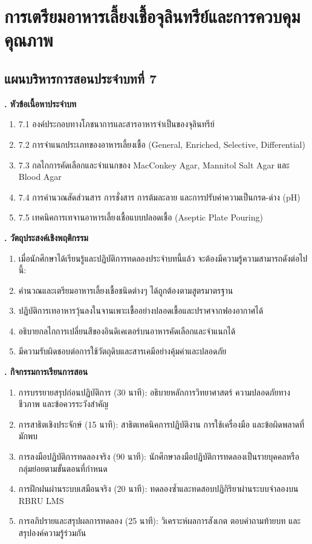 \chapter{การเตรียมอาหารเลี้ยงเชื้อจุลินทรีย์และการควบคุมคุณภาพ}
\label{chap:ch07}

\section*{แผนบริหารการสอนประจำบทที่ 7}

\noindent\textbf{. หัวข้อเนื้อหาประจำบท}

\begin{enumerate}
    \item 7.1 องค์ประกอบทางโภชนาการและสารอาหารจำเป็นของจุลินทรีย์
    \item 7.2 การจำแนกประเภทของอาหารเลี้ยงเชื้อ (General, Enriched, Selective, Differential)
    \item 7.3 กลไกการคัดเลือกและจำแนกของ MacConkey Agar, Mannitol Salt Agar และ Blood Agar
    \item 7.4 การคำนวณสัดส่วนสาร การชั่งสาร การต้มละลาย และการปรับค่าความเป็นกรด-ด่าง (pH)
    \item 7.5 เทคนิคการเทจานอาหารเลี้ยงเชื้อแบบปลอดเชื้อ (Aseptic Plate Pouring)
\end{enumerate}

\noindent\textbf{. วัตถุประสงค์เชิงพฤติกรรม}

\begin{enumerate}
    \item เมื่อนักศึกษาได้เรียนรู้และปฏิบัติการทดลองประจำบทนี้แล้ว จะต้องมีความรู้ความสามารถดังต่อไปนี้:
    \item คำนวณและเตรียมอาหารเลี้ยงเชื้อชนิดต่างๆ ได้ถูกต้องตามสูตรมาตรฐาน
    \item ปฏิบัติการเทอาหารวุ้นลงในจานเพาะเชื้ออย่างปลอดเชื้อและปราศจากฟองอากาศได้
    \item อธิบายกลไกการเปลี่ยนสีของอินดิเคเตอร์บนอาหารคัดเลือกและจำแนกได้
    \item มีความรับผิดชอบต่อการใช้วัตถุดิบและสารเคมีอย่างคุ้มค่าและปลอดภัย
\end{enumerate}

\noindent\textbf{. กิจกรรมการเรียนการสอน}

\begin{enumerate}
    \item การบรรยายสรุปก่อนปฏิบัติการ (30 นาที): อธิบายหลักการวิทยาศาสตร์ ความปลอดภัยทางชีวภาพ และข้อควรระวังสำคัญ
    \item การสาธิตเชิงประจักษ์ (15 นาที): สาธิตเทคนิคการปฏิบัติงาน การใช้เครื่องมือ และข้อผิดพลาดที่มักพบ
    \item การลงมือปฏิบัติการทดลองจริง (90 นาที): นักศึกษาลงมือปฏิบัติการทดลองเป็นรายบุคคลหรือกลุ่มย่อยตามขั้นตอนที่กำหนด
    \item การฝึกฝนผ่านระบบเสมือนจริง (20 นาที): ทดลองซ้ำและทดสอบปฏิกิริยาผ่านระบบจำลองบน RBRU LMS
    \item การอภิปรายและสรุปผลการทดลอง (25 นาที): วิเคราะห์ผลการสังเกต ตอบคำถามท้ายบท และสรุปองค์ความรู้ร่วมกัน
\end{enumerate}

